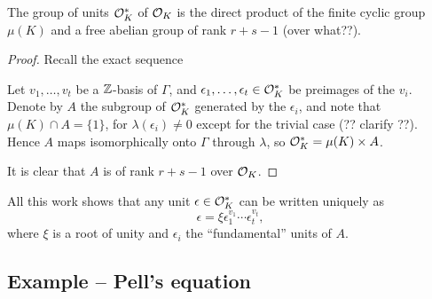 \begin{theorem}
	The group of units $\mathcal{O}^*_K$ of $\mathcal{O}_K$ is the direct product of the finite cyclic group $\mu(K)$ and a free abelian group of rank $r+s-1$ (over what??).
\end{theorem}
\begin{proof}
	Recall the exact sequence
	\begin{center}
	\end{center}
	Let $v_1,\dots,v_t$ be a $\mathbb{Z}$-basis of $\Gamma$, and $\epsilon_1,\dots,\epsilon_t\in\mathcal{O}^*_K$ be preimages of the $v_i$. Denote by $A$ the subgroup of $\mathcal{O}^*_K$ generated by the $\epsilon_i$, and note that $\mu(K)\cap A=\{1\}$, for $\lambda(\epsilon_i)\neq 0$ except for the trivial case (?? clarify ??). Hence $A$ maps isomorphically onto $\Gamma$ through $\lambda$, so $\mathcal{O}^*_K=\mu(K)\times A$.

	It is clear that $A$ is of rank $r+s-1$ over $\mathcal{O}_K$.

\end{proof}

All this work shows that any unit $\epsilon\in\mathcal{O}^*_K$ can be written uniquely as
\[
	\epsilon = \xi \epsilon_1^{v_1}\cdots\epsilon_t^{v_t},
\]
where $\xi$ is a root of unity and $\epsilon_i$ the ``fundamental'' units of $A$.


\subsection{Example -- Pell's equation}

